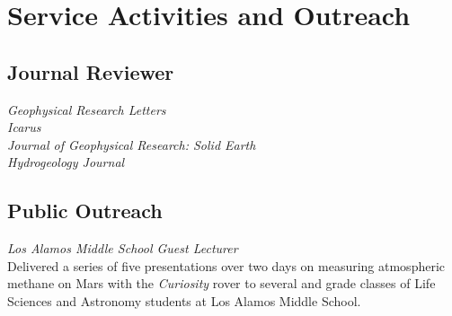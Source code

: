 \documentclass[11pt, letterpaper]{article}
\newcommand{\years}[1]{\marginnote{\scriptsize #1}}
\begin{document}
{{%

\section*{Service Activities and Outreach}

\hypersetup{linkcolor=black,citecolor=blue,filecolor=black,urlcolor=black}

% 




\subsection*{Journal Reviewer}

	\textit{Geophysical Research Letters}\\
	\textit{Icarus}\\
	\textit{Journal of Geophysical Research: Solid Earth}\\
	\textit{Hydrogeology Journal}



\subsection*{Public Outreach}
\setlength{\parskip}{0pt}
\noindent
\years{April 2024} \textit{Los Alamos Middle School Guest Lecturer}\\
Delivered a series of five presentations over two days on measuring atmospheric
methane on Mars with the \textit{Curiosity} rover to several  and
 grade classes of Life Sciences and Astronomy students at Los Alamos
Middle School. \\ 

}}
\end{document}
